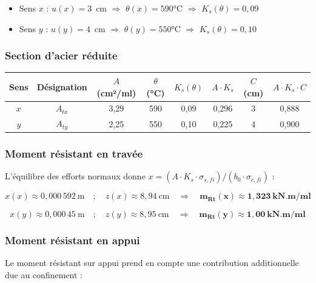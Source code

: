 \begin{itemize}
  \item Sens $x$ : $u(x) = 3$~cm $\Longrightarrow$ $\theta(x) = 590$°C $\Longrightarrow$ $K_s(\theta) = 0{,}09$
  \item Sens $y$ : $u(y) = 4$~cm $\Longrightarrow$ $\theta(y) = 550$°C $\Longrightarrow$ $K_s(\theta) = 0{,}10$
\end{itemize}

\subsubsection{Section d'acier réduite}

\begin{center}
\begin{tabularx}{\linewidth}{cccccccc}
\toprule
\textbf{Sens} & \textbf{Désignation} & \textbf{$A$ (cm²/ml)} & \textbf{$\theta$ (°C)} & \textbf{$K_s(\theta)$} & \textbf{$A \cdot K_s$} & \textbf{$C$ (cm)} & \textbf{$A \cdot K_s \cdot C$} \\
\midrule
$x$ & $A_{tx}$ & 3{,}29 & 590 & 0{,}09 & 0{,}296 & 3 & 0{,}888 \\
$y$ & $A_{ty}$ & 2{,}25 & 550 & 0{,}10 & 0{,}225 & 4 & 0{,}900 \\
\bottomrule
\end{tabularx}
\end{center}

\subsubsection{Moment résistant en travée}

L'équilibre des efforts normaux donne $x = (A \cdot K_s \cdot \sigma_{s,fi}) / (b_0 \cdot \sigma_{c,fi})$ :

\[
x(x) \approx 0{,}000\,592~\text{m}
\quad ; \quad
z(x) \approx 8{,}94~\text{cm}
\quad\Longrightarrow\quad
\mathbf{m_{Rt}(x) \approx 1{,}323~\text{kN.m/ml}}
\]

\[
x(y) \approx 0{,}000\,45~\text{m}
\quad ; \quad
z(y) \approx 8{,}95~\text{cm}
\quad\Longrightarrow\quad
\mathbf{m_{Rt}(y) \approx 1{,}00~\text{kN.m/ml}}
\]

\subsubsection{Moment résistant en appui}

Le moment résistant sur appui prend en compte une contribution additionnelle due au confinement :

